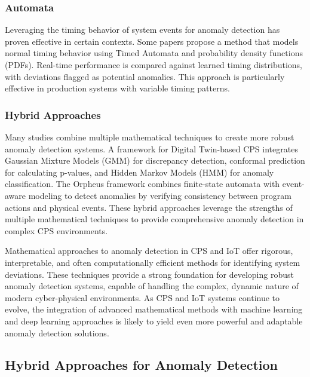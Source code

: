 \subsubsection{Automata}

Leveraging the timing behavior of system events for anomaly detection has proven effective in certain contexts. Some papers \cite{94} propose a method that models normal timing behavior using Timed Automata and probability density functions (PDFs). Real-time performance is compared against learned timing distributions, with deviations flagged as potential anomalies. This approach is particularly effective in production systems with variable timing patterns.

\subsubsection{Hybrid Approaches}

Many studies combine multiple mathematical techniques to create more robust anomaly detection systems. A framework for Digital Twin-based CPS \cite{61} integrates Gaussian Mixture Models (GMM) for discrepancy detection, conformal prediction for calculating p-values, and Hidden Markov Models (HMM) for anomaly classification. The Orpheus framework \cite{65} combines finite-state automata with event-aware modeling to detect anomalies by verifying consistency between program actions and physical events. These hybrid approaches leverage the strengths of multiple mathematical techniques to provide comprehensive anomaly detection in complex CPS environments.

Mathematical approaches to anomaly detection in CPS and IoT offer rigorous, interpretable, and often computationally efficient methods for identifying system deviations. These techniques provide a strong foundation for developing robust anomaly detection systems, capable of handling the complex, dynamic nature of modern cyber-physical environments. As CPS and IoT systems continue to evolve, the integration of advanced mathematical methods with machine learning and deep learning approaches is likely to yield even more powerful and adaptable anomaly detection solutions.






\subsection{Hybrid Approaches for Anomaly Detection}

